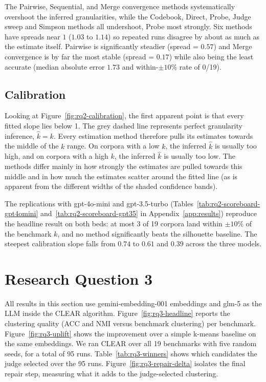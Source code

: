 \documentclass[11pt,a4paper,oneside]{report}
\begin{document}
The Pairwise, Sequential, and Merge convergence methods systematically overshoot the inferred granularities, while the Codebook, Direct, Probe, Judge sweep and Simpson methods all undershoot, Probe most strongly. Six methods have spreads near $1$ ($1.03$ to $1.14$) so repeated runs disagree by about as much as the estimate itself. Pairwise is significantly steadier (spread = $0.57$) and Merge convergence is by far the most stable (spread = $0.17$) while also being the least accurate (median absolute error $1.73$ and within-$\pm 10\%$ rate of 0/19).

\subsection{Calibration}

Looking at Figure~\ref{fig:rq2-calibration}, the first apparent point is that every fitted slope lies below 1. The grey dashed line represents perfect granularity inference, $\hat{k} = k$. Every estimation method therefore pulls its estimates towards the middle of the $k$ range. On corpora with a low $k$, the inferred $\hat{k}$ is usually too high, and on corpora with a high $k$, the inferred $\hat{k}$ is usually too low. The methods differ mainly in how strongly the estimates are pulled towards this middle and in how much the estimates scatter around the fitted line (as is apparent from the different widths of the shaded confidence bands).

The replications with {\small\ttfamily gpt-4o-mini} and
{\small\ttfamily gpt-3.5-turbo}
(Tables~\ref{tab:rq2-scoreboard-gpt4omini}
and~\ref{tab:rq2-scoreboard-gpt35} in Appendix~\ref{app:results})
reproduce the headline result on both beds: at most 3 of 19 corpora
land within $\pm 10\%$ of the benchmark $k$, and no method
significantly beats the silhouette baseline. The steepest calibration
slope falls from $0.74$ to $0.61$ and $0.39$ across the three models.

\section{Research Question 3}

All results in this section use {\small\ttfamily gemini-embedding-001} embeddings and {\small\ttfamily glm-5} as the LLM inside the CLEAR algorithm. Figure~\ref{fig:rq3-headline} reports the clustering quality (ACC and NMI versus benchmark clustering) per benchmark. Figure~\ref{fig:rq3-uplift} shows the improvement over a simple k-means baseline on the same embeddings. We ran CLEAR over all 19 benchmarks with five random seeds, for a total of 95 runs. Table~\ref{tab:rq3-winners} shows which candidates the judge selected over the 95 runs. Figure~\ref{fig:rq3-repair-delta} isolates the final repair step, measuring what it adds to the judge-selected clustering.
\end{document}
